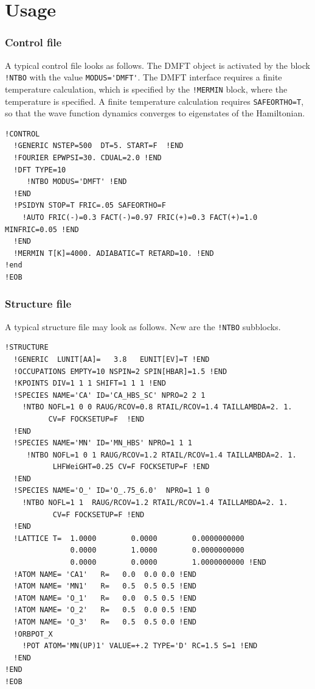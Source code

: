 \documentclass[11pt,a4paper]{report}
\begin{document}
\chapter{Usage}
\subsection{Control file}
A typical control file looks as follows. The DMFT object is activated
by the block \verb|!NTBO| with the value \verb|MODUS='DMFT'|. The DMFT
interface requires a finite temperature calculation, which is
specified by the \verb|!MERMIN| block, where the temperature is
specified.  A finite temperature calculation requires
\verb|SAFEORTHO=T|, so that the wave function dynamics converges to
eigenstates of the Hamiltonian.
\begin{verbatim}
!CONTROL
  !GENERIC NSTEP=500  DT=5. START=F  !END 
  !FOURIER EPWPSI=30. CDUAL=2.0 !END
  !DFT TYPE=10  
     !NTBO MODUS='DMFT' !END   
  !END 
  !PSIDYN STOP=T FRIC=.05 SAFEORTHO=F
    !AUTO FRIC(-)=0.3 FACT(-)=0.97 FRIC(+)=0.3 FACT(+)=1.0 MINFRIC=0.05 !END
  !END
  !MERMIN T[K]=4000. ADIABATIC=T RETARD=10. !END
!end
!EOB
\end{verbatim}

\subsection{Structure file}
A typical structure file may look as follows. New are the \verb|!NTBO|
subblocks.
\begin{verbatim}
!STRUCTURE 
  !GENERIC  LUNIT[AA]=   3.8   EUNIT[EV]=T !END
  !OCCUPATIONS EMPTY=10 NSPIN=2 SPIN[HBAR]=1.5 !END
  !KPOINTS DIV=1 1 1 SHIFT=1 1 1 !END
  !SPECIES NAME='CA' ID='CA_HBS_SC' NPRO=2 2 1 
    !NTBO NOFL=1 0 0 RAUG/RCOV=0.8 RTAIL/RCOV=1.4 TAILLAMBDA=2. 1.
          CV=F FOCKSETUP=F  !END 
  !END
  !SPECIES NAME='MN' ID='MN_HBS' NPRO=1 1 1 
     !NTBO NOFL=1 0 1 RAUG/RCOV=1.2 RTAIL/RCOV=1.4 TAILLAMBDA=2. 1.
           LHFWeiGHT=0.25 CV=F FOCKSETUP=F !END 
  !END
  !SPECIES NAME='O_' ID='O_.75_6.0'  NPRO=1 1 0
    !NTBO NOFL=1 1  RAUG/RCOV=1.2 RTAIL/RCOV=1.4 TAILLAMBDA=2. 1.
           CV=F FOCKSETUP=F !END 
  !END
  !LATTICE T=  1.0000        0.0000        0.0000000000
               0.0000        1.0000        0.0000000000
               0.0000        0.0000        1.0000000000 !END
  !ATOM NAME= 'CA1'   R=   0.0  0.0 0.0 !END
  !ATOM NAME= 'MN1'   R=   0.5  0.5 0.5 !END
  !ATOM NAME= 'O_1'   R=   0.0  0.5 0.5 !END
  !ATOM NAME= 'O_2'   R=   0.5  0.0 0.5 !END
  !ATOM NAME= 'O_3'   R=   0.5  0.5 0.0 !END
  !ORBPOT_X
    !POT ATOM='MN(UP)1' VALUE=+.2 TYPE='D' RC=1.5 S=1 !END
  !END
!END 
!EOB
\end{verbatim}
\end{document}
